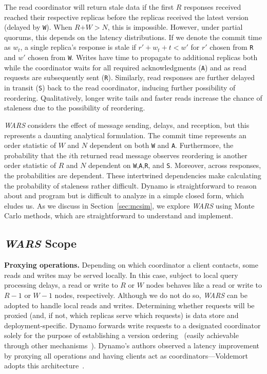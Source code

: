 \documentclass{vldb}
\newcommand{\subsectionskip}{-0em}
\begin{document}
The read coordinator will return stale data if the first $R$ responses
received reached their respective replicas before the replicas
received the latest version (delayed by \texttt{W}).  When
$R$$+$$W$$>$$N$, this is impossible.  However, under partial quorums,
this depends on the latency distributions.  If we denote the commit
time as $w_t$, a single replica's response is stale if $r'+w_t+t< w'$
for $r'$ chosen from \texttt{R} and $w'$ chosen from \texttt{W}.
Writes have time to propagate to additional replicas both while the
coordinator waits for all required acknowledgments (\texttt{A}) and as
read requests are subsequently sent (\texttt{R}).  Similarly, read
responses are further delayed in transit (\texttt{S}) back to the read
coordinator, inducing further possibility of reordering.
Qualitatively, longer write tails and faster reads increase the chance
of staleness due to the possibility of reordering.

\textit{WARS} considers the effect of message sending, delays, and
reception, but this represents a daunting analytical formulation.  The
commit time represents an order statistic of $W$ and $N$ dependent on
both \texttt{W} and \texttt{A}.  Furthermore, the probability that the
$i$th returned read message observes reordering is another order
statistic of $R$ and $N$ dependent on
\texttt{W},\texttt{A},\texttt{R}, and \texttt{S}.  Moreover, across
responses, the probabilities are dependent. These intertwined
dependencies make calculating the probability of staleness rather
difficult.  Dynamo is straightforward to reason about and program but
is difficult to analyze in a simple closed form, which eludes us.  As
we discuss in Section~\ref{sec:mcsim}, we explore \textit{WARS} using
Monte Carlo methods, which are straightforward to understand and
implement.

\vspace{\subsectionskip}\subsection{{\large \textit{WARS}} Scope}
\label{sec:anti-entropy}

\textbf{Proxying operations.} Depending on which coordinator a client
contacts, some reads and writes may be served locally.  In this case,
subject to local query processing delays, a read or write to $R$ or
$W$ nodes behaves like a read or write to $R-1$ or $W-1$ nodes,
respectively.  Although we do not do so, \textit{WARS} can be adopted
to handle local reads and writes.  Determining whether requests will
be proxied (and, if not, which replicas serve which requests) is data
store and deployment-specific.  Dynamo forwards write requests to a
designated coordinator solely for the purpose of establishing a
version ordering~\cite[Section 6.4]{dynamo} (easily achievable through
other mechanisms~\cite{zookeeper}).  Dynamo's authors observed a
latency improvement by proxying all operations and having clients act
as coordinators---Voldemort adopts this
architecture~\cite{voldemortclient}.
\end{document}
